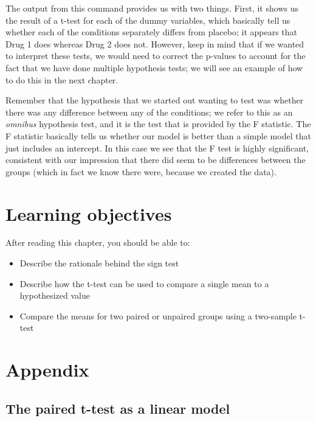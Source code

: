 \documentclass[12pt,]{book}
\providecommand{\tightlist}{%
  \setlength{\itemsep}{0pt}\setlength{\parskip}{0pt}}
\theoremstyle{definition}
\theoremstyle{definition}
\theoremstyle{definition}
\theoremstyle{remark}
\begin{document}
The output from this command provides us with two things. First, it shows us the result of a t-test for each of the dummy variables, which basically tell us whether each of the conditions separately differs from placebo; it appears that Drug 1 does whereas Drug 2 does not. However, keep in mind that if we wanted to interpret these tests, we would need to correct the p-values to account for the fact that we have done multiple hypothesis tests; we will see an example of how to do this in the next chapter.

Remember that the hypothesis that we started out wanting to test was whether there was any difference between any of the conditions; we refer to this as an \emph{omnibus} hypothesis test, and it is the test that is provided by the F statistic. The F statistic basically tells us whether our model is better than a simple model that just includes an intercept. In this case we see that the F test is highly significant, consistent with our impression that there did seem to be differences between the groups (which in fact we know there were, because we created the data).

\hypertarget{learning-objectives-14}{%
\section{Learning objectives}\label{learning-objectives-14}}

After reading this chapter, you should be able to:

\begin{itemize}
\tightlist
\item
  Describe the rationale behind the sign test
\item
  Describe how the t-test can be used to compare a single mean to a hypothesized value
\item
  Compare the means for two paired or unpaired groups using a two-sample t-test
\end{itemize}

\hypertarget{appendix-6}{%
\section{Appendix}\label{appendix-6}}

\hypertarget{the-paired-t-test-as-a-linear-model}{%
\subsection{The paired t-test as a linear model}\label{the-paired-t-test-as-a-linear-model}}
\end{document}

